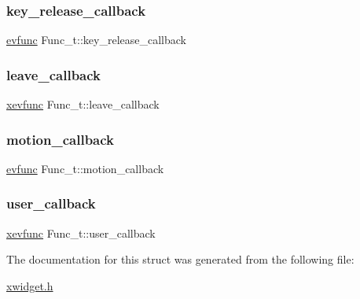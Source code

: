 \mbox{\label{structFunc__t_a8c7138616caa404a9af064d673d7e0f8}} 
\subsubsection{\texorpdfstring{key\+\_\+release\+\_\+callback}{key\_release\_callback}}
{\footnotesize\ttfamily \hyperlink{xwidget_8h_ab4ae973f86a383c8c0f92b709044520a}{evfunc} Func\+\_\+t\+::key\+\_\+release\+\_\+callback}

\mbox{\label{structFunc__t_a1801ba902bd7efc706d474312f960d0a}} 
\subsubsection{\texorpdfstring{leave\+\_\+callback}{leave\_callback}}
{\footnotesize\ttfamily \hyperlink{xwidget_8h_a9ef0263424a7f5f8f6b02055fca67ddd}{xevfunc} Func\+\_\+t\+::leave\+\_\+callback}

\mbox{\label{structFunc__t_ac2842c834907f4aeace8f404c6cc7621}} 
\subsubsection{\texorpdfstring{motion\+\_\+callback}{motion\_callback}}
{\footnotesize\ttfamily \hyperlink{xwidget_8h_ab4ae973f86a383c8c0f92b709044520a}{evfunc} Func\+\_\+t\+::motion\+\_\+callback}

\mbox{\label{structFunc__t_a1f089cb13a39764a1f980470a51db71b}} 
\subsubsection{\texorpdfstring{user\+\_\+callback}{user\_callback}}
{\footnotesize\ttfamily \hyperlink{xwidget_8h_a9ef0263424a7f5f8f6b02055fca67ddd}{xevfunc} Func\+\_\+t\+::user\+\_\+callback}



The documentation for this struct was generated from the following file\+:\begin{DoxyCompactItemize}
\item 
\hyperlink{xwidget_8h}{xwidget.\+h}\end{DoxyCompactItemize}

